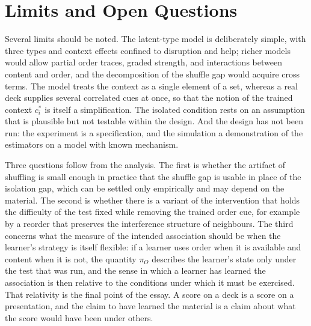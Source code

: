 \documentclass[11pt]{article}
\theoremstyle{remark}
\begin{document}
\section{Limits and Open Questions}

Several limits should be noted. The latent-type model is deliberately simple, with three types and context effects confined to disruption and help; richer models would allow partial order traces, graded strength, and interactions between content and order, and the decomposition of the shuffle gap would acquire cross terms. The model treats the context as a single element of a set, whereas a real deck supplies several correlated cues at once, so that the notion of the trained context $c^\ast_i$ is itself a simplification. The isolated condition rests on an assumption that is plausible but not testable within the design. And the design has not been run: the experiment is a specification, and the simulation a demonstration of the estimators on a model with known mechanism.

Three questions follow from the analysis. The first is whether the artifact of shuffling is small enough in practice that the shuffle gap is usable in place of the isolation gap, which can be settled only empirically and may depend on the material. The second is whether there is a variant of the intervention that holds the difficulty of the test fixed while removing the trained order cue, for example by a reorder that preserves the interference structure of neighbours. The third concerns what the measure of the intended association should be when the learner's strategy is itself flexible: if a learner uses order when it is available and content when it is not, the quantity $\pi_O$ describes the learner's state only under the test that was run, and the sense in which a learner has learned the association is then relative to the conditions under which it must be exercised. That relativity is the final point of the essay. A score on a deck is a score on a presentation, and the claim to have learned the material is a claim about what the score would have been under others.
\end{document}
